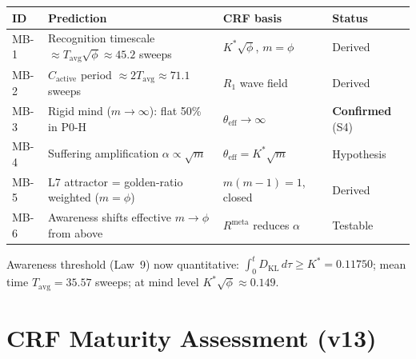 \documentclass[12pt, a4paper]{article}
\begin{document}
\begin{keybox}[title={Mind-Layer Bridge Predictions (MB-1 through MB-6)}]
\begin{center}
\renewcommand{\arraystretch}{1.3}
\begin{tabular}{p{0.8cm} p{5.2cm} p{2.5cm} p{3cm}}
\toprule
\textbf{ID} & \textbf{Prediction} & \textbf{CRF basis} & \textbf{Status} \\
\midrule
MB-1 & Recognition timescale $\approx T_{\mathrm{avg}}\sqrt{\phi}\approx 45.2$ sweeps & $K^*\sqrt{\phi}$, $m=\phi$ & Derived \\
MB-2 & $C_{\mathrm{active}}$ period $\approx 2T_{\mathrm{avg}}\approx 71.1$ sweeps & $R_1$ wave field & Derived \\
MB-3 & Rigid mind ($m\to\infty$): flat 50\% in P0-H & $\theta_{\mathrm{eff}}\to\infty$ & \textbf{Confirmed} (S4) \\
MB-4 & Suffering amplification $\alpha\propto\sqrt{m}$ & $\theta_{\mathrm{eff}} = K^*\sqrt{m}$ & Hypothesis \\
MB-5 & L7 attractor = golden-ratio weighted ($m=\phi$) & $m(m-1)=1$, closed & Derived \\
MB-6 & Awareness shifts effective $m\to\phi$ from above & $R^{\mathrm{meta}}$ reduces $\alpha$ & Testable \\
\bottomrule
\end{tabular}
\end{center}

Awareness threshold (Law~9) now quantitative: $\int_0^t D_{\mathrm{KL}}\,d\tau \geq K^* = 0.11750$;
mean time $T_{\mathrm{avg}} = 35.57$ sweeps; at mind level $K^*\sqrt{\phi}\approx 0.149$.
\end{keybox}

\section{CRF Maturity Assessment (v13)}
\end{document}
